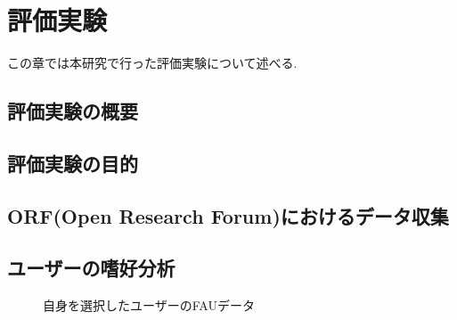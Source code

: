 \chapter{評価実験}
\label{chap:main_experiment}

この章では本研究で行った評価実験について述べる.

\section{評価実験の概要}
\section{評価実験の目的}
\section{ORF(Open Research Forum)におけるデータ収集}
\section{ユーザーの嗜好分析}

\begin{figure}[htbp]
    \begin{center}
    \end{center}
    \caption{自身を選択したユーザーのFAUデータ}
    \label{fig:choice_myself_fau_for_paper}
\end{figure}

